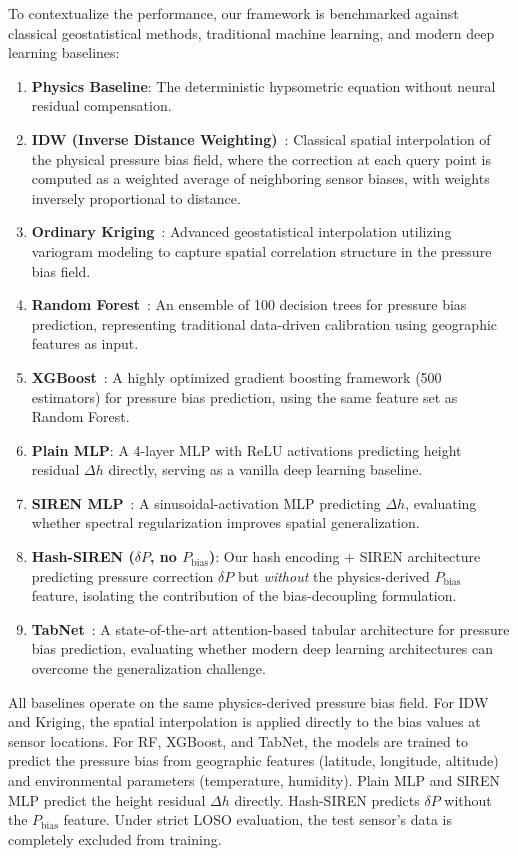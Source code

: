 To contextualize the performance, our framework is benchmarked against classical geostatistical methods, traditional machine learning, and modern deep learning baselines:
\begin{enumerate}
    \item \textbf{Physics Baseline}: The deterministic hypsometric equation without neural residual compensation.
    \item \textbf{IDW (Inverse Distance Weighting)}~\cite{shepard1968two}: Classical spatial interpolation of the physical pressure bias field, where the correction at each query point is computed as a weighted average of neighboring sensor biases, with weights inversely proportional to distance.
    \item \textbf{Ordinary Kriging}~\cite{cressie1993statistics}: Advanced geostatistical interpolation utilizing variogram modeling to capture spatial correlation structure in the pressure bias field.
    \item \textbf{Random Forest}~\cite{breiman2001random}: An ensemble of 100 decision trees for pressure bias prediction, representing traditional data-driven calibration using geographic features as input.
    \item \textbf{XGBoost}~\cite{chen2016xgboost}: A highly optimized gradient boosting framework (500 estimators) for pressure bias prediction, using the same feature set as Random Forest.
    \item \textbf{Plain MLP}: A 4-layer MLP with ReLU activations predicting height residual $\Delta h$ directly, serving as a vanilla deep learning baseline.
    \item \textbf{SIREN MLP}~\cite{sitzmann2020implicit}: A sinusoidal-activation MLP predicting $\Delta h$, evaluating whether spectral regularization improves spatial generalization.
    \item \textbf{Hash-SIREN ($\delta P$, no $P_{\text{bias}}$)}: Our hash encoding + SIREN architecture predicting pressure correction $\delta P$ but \emph{without} the physics-derived $P_{\text{bias}}$ feature, isolating the contribution of the bias-decoupling formulation.
    \item \textbf{TabNet}~\cite{arik2021tabnet}: A state-of-the-art attention-based tabular architecture for pressure bias prediction, evaluating whether modern deep learning architectures can overcome the generalization challenge.
\end{enumerate}

All baselines operate on the same physics-derived pressure bias field. For IDW and Kriging, the spatial interpolation is applied directly to the bias values at sensor locations. For RF, XGBoost, and TabNet, the models are trained to predict the pressure bias from geographic features (latitude, longitude, altitude) and environmental parameters (temperature, humidity). Plain MLP and SIREN MLP predict the height residual $\Delta h$ directly. Hash-SIREN predicts $\delta P$ without the $P_{\text{bias}}$ feature. Under strict LOSO evaluation, the test sensor's data is completely excluded from training.


